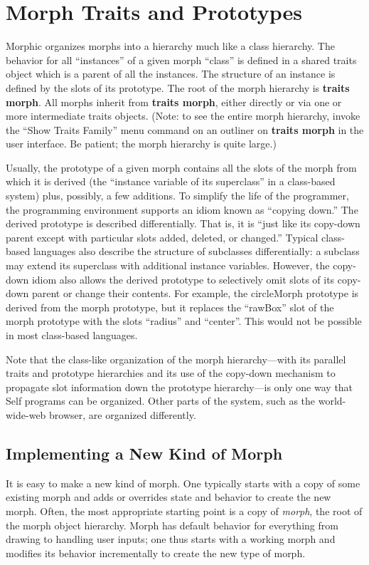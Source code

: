 \documentclass[letterpaper,10pt,english]{sphinxmanual}
\begin{document}
\section{Morph Traits and Prototypes}
\label{morphic:morph-traits-and-prototypes}
Morphic organizes morphs into a hierarchy much like a class hierarchy. The behavior for all ``instances'' of a given morph ``class'' is defined in a shared traits object which is a parent of all the instances. The structure of an instance is defined by the slots of its prototype. The root of the morph hierarchy is \textbf{traits morph}. All morphs inherit from \textbf{traits morph}, either directly or via one or more intermediate traits objects. (Note: to see the entire morph hierarchy, invoke the ``Show Traits Family'' menu command on an outliner on \textbf{traits morph} in the user interface. Be patient; the morph hierarchy is quite large.)

Usually, the prototype of a given morph contains all the slots of the morph from which it is derived (the ``instance variable of its superclass'' in a class-based system) plus, possibly, a few additions. To simplify the life of the programmer, the programming environment supports an idiom known as ``copying down.'' The derived prototype is described differentially. That is, it is ``just like its copy-down parent except with particular slots added, deleted, or changed.'' Typical class-based languages also describe the structure of subclasses differentially: a subclass may extend its superclass with additional instance variables. However, the copy-down idiom also allows the derived prototype to selectively omit slots of its copy-down parent or change their contents. For example, the circleMorph prototype is derived from the morph prototype, but it replaces the ``rawBox'' slot of the morph prototype with the slots ``radius'' and ``center''. This would not be possible in most class-based languages.

Note that the class-like organization of the morph hierarchy—with its parallel traits and prototype hierarchies and its use of the copy-down mechanism to propagate slot information down the prototype hierarchy—is only one way that Self programs can be organized. Other parts of the system, such as the world-wide-web browser, are organized differently.


\subsection{Implementing a New Kind of Morph}
\label{morphic:implementing-a-new-kind-of-morph}
It is easy to make a new kind of morph. One typically starts with a copy of some existing morph and adds or overrides state and behavior to create the new morph. Often, the most appropriate starting point is a copy of \emph{morph}, the root of the morph object hierarchy. Morph has default behavior for everything from drawing to handling user inputs; one thus starts with a working morph and modifies its behavior incrementally to create the new type of morph.
\end{document}
